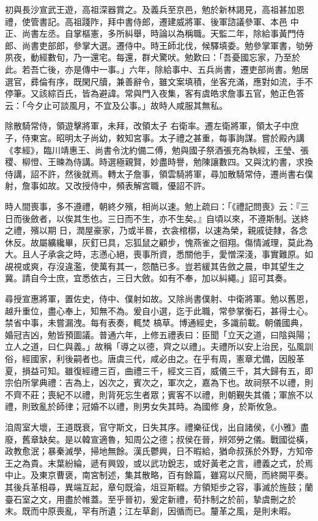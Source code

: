 \begin{pinyinscope}
 初與長沙宣武王遊，高祖深器賞之。及義兵至京邑，勉於新林謁見，高祖甚加恩禮，使管書記。高祖踐阼，拜中書侍郎，遷建威將軍、後軍諮議參軍、本邑
 中正、尚書左丞。自掌樞憲，多所糾舉，時論以為稱職。天監二年，除給事黃門侍郎、尚書吏部郎，參掌大選。遷侍中。時王師北伐，候驛填委。勉參掌軍書，劬勞夙夜，動經數旬，乃一還宅。每還，群犬驚吠。勉歎曰：「吾憂國忘家，乃至於此。若吾亡後，亦是傳中一事。」六年，除給事中、五兵尚書，遷吏部尚書。勉居選官，彞倫有序，既閑尺牘，兼善辭令，雖文案填積，坐客充滿，應對如流，手不停筆。又該綜百氏，皆為避諱。常與門入夜集，客有虞皓求詹事五官，勉正色答云：「今夕止可談風月，不宜及公事。」故時人咸服其無私。



 除散騎常侍，領遊擊將軍，未拜，改領太子
 右衛率。遷左衛將軍，領太子中庶子，侍東宮。昭明太子尚幼，敕知宮事。太子禮之甚重，每事詢謀。嘗於殿內講《孝經》，臨川靖惠王、尚書令沈約備二傅，勉與國子祭酒張充為執經，王瑩、張稷、柳憕、王暕為侍講。時選極親賢，妙盡時譽，勉陳讓數四。又與沈約書，求換侍講，詔不許，然後就焉。轉太子詹事，領雲騎將軍，尋加散騎常侍，遷尚書右僕射，詹事如故。又改授侍中，頻表解宮職，優詔不許。



 時人間喪事，多不遵禮，朝終夕殯，相尚以速。勉上疏曰：「《禮記問喪》云：『三日而後斂者，以俟其生也。三日而不生，亦不生矣。』自頃以來，不遵斯制。送終之禮，殯以期
 日，潤屋豪家，乃或半晷，衣衾棺槨，以速為榮，親戚徒隸，各念休反。故屬纊纔畢，灰釘已具，忘狐鼠之顧步，愧燕雀之徊翔。傷情滅理，莫此為大。且人子承衾之時，志懣心絕，喪事所資，悉關他手，愛憎深淺，事實難原。如覘視或爽，存沒違濫，使萬有其一，怨酷已多。豈若緩其告斂之晨，申其望生之冀。請自今士庶，宜悉依古，三日大斂。如有不奉，加以糾繩。」詔可其奏。



 尋授宣惠將軍，置佐史，侍中、僕射如故。又除尚書僕射、中衛將軍。勉以舊恩，越升重位，盡心奉上，知無不為。爰自小選，迄于此職，常參掌衡石，甚得士心。禁省中事，未嘗漏洩。每有表奏，輒焚
 槁草。博通經史，多識前載。朝儀國典，婚冠吉凶，勉皆預圖議。普通六年，上修五禮表曰：臣聞「立天之道，曰陰與陽；立人之道，曰仁與義。」故稱「導之以德，齊之以禮」。夫禮所以安上治民，弘風訓俗，經國家，利後嗣者也。唐虞三代，咸必由之。在乎有周，憲章尤備，因殷革夏，損益可知。雖復經禮三百，曲禮三千，經文三百，威儀三千，其大歸有五，即宗伯所掌典禮：吉為上，凶次之，賓次之，軍次之，嘉為下也。故祠祭不以禮，則不齊不莊；喪紀不以禮，則背死忘生者眾；賓客不以禮，則朝覲失其儀；軍旅不以禮，則致亂於師律；冠婚不以禮，則男女失其時。為國修
 身，於斯攸急。



 洎周室大壞，王道既衰，官守斯文，日失其序。禮樂征伐，出自諸侯，《小雅》盡廢，舊章缺矣。是以韓宣適魯，知周公之德；叔侯在晉，辨郊勞之儀。戰國從橫，政教愈泯；暴秦滅學，掃地無餘。漢氏鬱興，日不暇給，猶命叔孫於外野，方知帝王之為貴。末葉紛綸，遞有興毀，或以武功銳志，或好黃老之言，禮義之式，於焉中止。及東京曹褒，南宮制述，集其散略，百有餘篇，雖寫以尺簡，而終闕平奏。其後兵革相尋，異端互起，章句既淪，俎豆斯輟。方領矩步之容，事滅於旌鼓；蘭臺石室之文，用盡於帷蓋。至乎晉初，爰定新禮，荀抃制之於前，摯虞刪之於
 末。既而中原喪亂，罕有所遺；江左草創，因循而已。釐革之風，是則未暇。




\end{pinyinscope}
